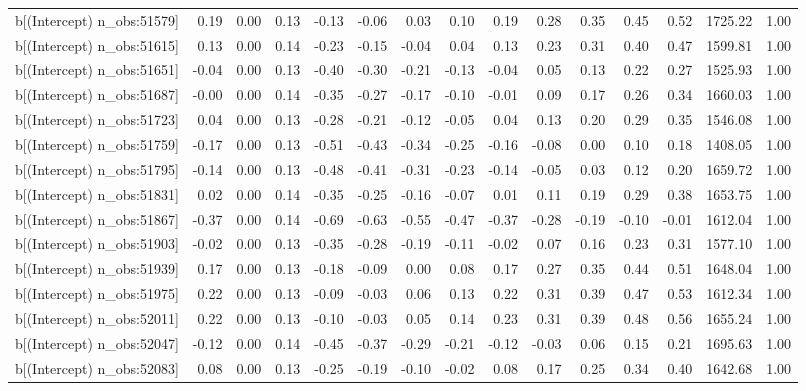 \begin{table}[ht]
\begin{tabular}{rrrrrrrrrrrrrrr}
  b[(Intercept) n\_obs:51579] & 0.19 & 0.00 & 0.13 & -0.13 & -0.06 & 0.03 & 0.10 & 0.19 & 0.28 & 0.35 & 0.45 & 0.52 & 1725.22 & 1.00 \\ 
  b[(Intercept) n\_obs:51615] & 0.13 & 0.00 & 0.14 & -0.23 & -0.15 & -0.04 & 0.04 & 0.13 & 0.23 & 0.31 & 0.40 & 0.47 & 1599.81 & 1.00 \\ 
  b[(Intercept) n\_obs:51651] & -0.04 & 0.00 & 0.13 & -0.40 & -0.30 & -0.21 & -0.13 & -0.04 & 0.05 & 0.13 & 0.22 & 0.27 & 1525.93 & 1.00 \\ 
  b[(Intercept) n\_obs:51687] & -0.00 & 0.00 & 0.14 & -0.35 & -0.27 & -0.17 & -0.10 & -0.01 & 0.09 & 0.17 & 0.26 & 0.34 & 1660.03 & 1.00 \\ 
  b[(Intercept) n\_obs:51723] & 0.04 & 0.00 & 0.13 & -0.28 & -0.21 & -0.12 & -0.05 & 0.04 & 0.13 & 0.20 & 0.29 & 0.35 & 1546.08 & 1.00 \\ 
  b[(Intercept) n\_obs:51759] & -0.17 & 0.00 & 0.13 & -0.51 & -0.43 & -0.34 & -0.25 & -0.16 & -0.08 & 0.00 & 0.10 & 0.18 & 1408.05 & 1.00 \\ 
  b[(Intercept) n\_obs:51795] & -0.14 & 0.00 & 0.13 & -0.48 & -0.41 & -0.31 & -0.23 & -0.14 & -0.05 & 0.03 & 0.12 & 0.20 & 1659.72 & 1.00 \\ 
  b[(Intercept) n\_obs:51831] & 0.02 & 0.00 & 0.14 & -0.35 & -0.25 & -0.16 & -0.07 & 0.01 & 0.11 & 0.19 & 0.29 & 0.38 & 1653.75 & 1.00 \\ 
  b[(Intercept) n\_obs:51867] & -0.37 & 0.00 & 0.14 & -0.69 & -0.63 & -0.55 & -0.47 & -0.37 & -0.28 & -0.19 & -0.10 & -0.01 & 1612.04 & 1.00 \\ 
  b[(Intercept) n\_obs:51903] & -0.02 & 0.00 & 0.13 & -0.35 & -0.28 & -0.19 & -0.11 & -0.02 & 0.07 & 0.16 & 0.23 & 0.31 & 1577.10 & 1.00 \\ 
  b[(Intercept) n\_obs:51939] & 0.17 & 0.00 & 0.13 & -0.18 & -0.09 & 0.00 & 0.08 & 0.17 & 0.27 & 0.35 & 0.44 & 0.51 & 1648.04 & 1.00 \\ 
  b[(Intercept) n\_obs:51975] & 0.22 & 0.00 & 0.13 & -0.09 & -0.03 & 0.06 & 0.13 & 0.22 & 0.31 & 0.39 & 0.47 & 0.53 & 1612.34 & 1.00 \\ 
  b[(Intercept) n\_obs:52011] & 0.22 & 0.00 & 0.13 & -0.10 & -0.03 & 0.05 & 0.14 & 0.23 & 0.31 & 0.39 & 0.48 & 0.56 & 1655.24 & 1.00 \\ 
  b[(Intercept) n\_obs:52047] & -0.12 & 0.00 & 0.14 & -0.45 & -0.37 & -0.29 & -0.21 & -0.12 & -0.03 & 0.06 & 0.15 & 0.21 & 1695.63 & 1.00 \\ 
  b[(Intercept) n\_obs:52083] & 0.08 & 0.00 & 0.13 & -0.25 & -0.19 & -0.10 & -0.02 & 0.08 & 0.17 & 0.25 & 0.34 & 0.40 & 1642.68 & 1.00 \\ 

\end{tabular}
\end{table}
